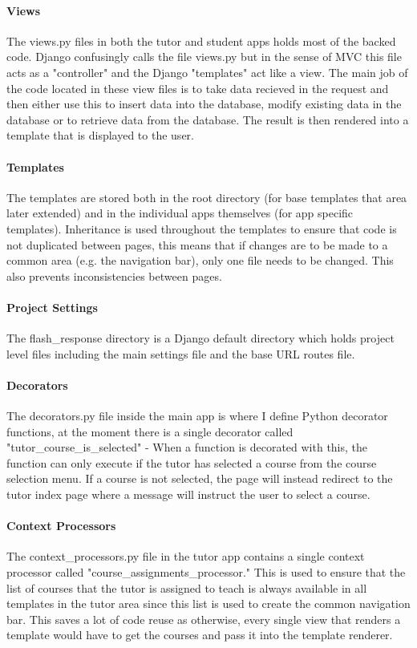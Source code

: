\documentclass[10pt]{report}
\begin{document}
	\paragraph{Views}
	The views.py files in both the tutor and student apps holds most of the backed code. Django
	confusingly calls the file views.py but in the sense of MVC this file acts as a "controller" and the
	Django "templates" act like a view.  The main job of the code located in these view files is to take
	data recieved in the request and then either use this to insert data into the database, modify
	existing data in the database or to retrieve data from the database.  The result is then rendered into
	a template that is displayed to the user.
	
	\paragraph{Templates}
	The templates are stored both in the root directory (for base templates that area later extended) and
	in the individual apps themselves (for app specific templates).  Inheritance is used throughout the
	templates to ensure that code is not duplicated between pages, this means that if changes are to be
	made to a common area (e.g. the navigation bar), only one file needs to be changed.  This also
	prevents inconsistencies between pages.
	
	\paragraph{Project Settings}
	The flash\_response directory is a Django default directory which holds project level files including
	the main settings file and the base URL routes file.
	
	\paragraph{Decorators}
	The decorators.py file inside the main app is where I define Python decorator functions, at the moment
	there is a single decorator called "tutor\_course\_is\_selected" - When a function is decorated with
	this, the function can only execute if the tutor has selected a course from the course selection menu.
	If a course is not selected, the page will instead redirect to the tutor index page where a message
	will instruct the user to select a course.
	
	\paragraph{Context Processors}
	The context\_processors.py file in the tutor app contains a single context processor called 
	"course\_assignments\_processor."  This is used to ensure that the list of courses that the tutor
	is assigned to teach is always available in all templates in the tutor area since this list is used
	to create the common navigation bar.  This saves a lot of code reuse as otherwise, every single view
	that renders a template would have to get the courses and pass it into the template renderer.
	
\end{document}
